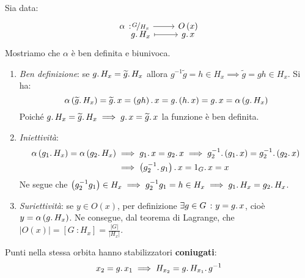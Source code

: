 \begin{demonstration}
Sia data:
\begin{equation*}
	\funztot{\alpha}{\nicefrac{G}{H_x}}{O\left(x\right)}{g\ldotp H_x}{g\ldotp x}
\end{equation*}
Mostriamo che $\alpha$ è ben definita e biunivoca.
\begin{enumerate}
	\item \textit{Ben definizione}: se $g\ldotp H_x=\widetilde{g}\ldotp H_x$ allora $g^{-1}\widetilde{g}=h\in H_x\implies\widetilde{g}=gh\in H_x$. Si ha:
	\begin{equation*}
		\alpha\left(\widetilde{g}\ldotp H_x\right)=\widetilde{g}\ldotp x = \left(gh\right)\ldotp x = g \ldotp\left( h\ldotp x\right)=g\ldotp x=\alpha\left(g\ldotp H_x\right)
	\end{equation*}
 Poiché $g\ldotp H_x=\widetilde{g}\ldotp H_x\implies g\ldotp x=\widetilde{g}\ldotp x$ la funzione è ben definita.
 \item \textit{Iniettività}:
 \begin{align*}
 	\alpha\left(g_1\ldotp H_x\right)=\alpha\left(g_2\ldotp H_x\right)&\implies g_1\ldotp x=g_2\ldotp x\implies g_2^{-1}\ldotp\left(g_1\ldotp x\right)=g_2^{-1}\ldotp\left(g_2\ldotp x\right)\\
 	&\implies \left(g_2^{-1}\ldotp g_1\right)\ldotp x=1_G\ldotp x=x
 \end{align*}
Ne segue che $\left(g_2^{-1} g_1\right)\in H_x\implies g_2^{-1} g_1=h\in H_x\implies g_1\ldotp H_x=g_2\ldotp H_x$.
\item \textit{Suriettività}: se $y\in O\left(x\right)$, per definizione $\exists g\in G\ \colon y=g\ldotp x$, cioè $y=\alpha\left(g\ldotp H_x\right)$.
Ne consegue, dal teorema di Lagrange, che $\lvert O\left(x\right)\rvert = \left[G\ \colon H_x\right]= \frac{\lvert G\rvert}{\lvert H_x\rvert}$.
\end{enumerate}
\vspace{-3mm}
\end{demonstration}
\begin{observe}
Punti nella stessa orbita hanno stabilizzatori \textbf{coniugati}:
\begin{equation}
x_2=g\ldotp x_1\implies H_{x_2}=g\ldotp H_{x_1}\ldotp g^{-1}
\end{equation}
\vspace{-5mm}
\end{observe}

